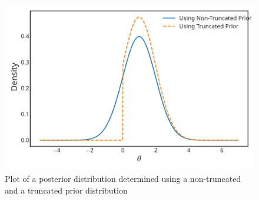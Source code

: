 {\begin{figure}[h!]
\includegraphics{images/truncposterior.svg}
\caption{Plot of a posterior distribution determined using a
non-truncated and a truncated prior distribution}
\label{fig:posttrunc}

\end{figure}}
\clearpage

